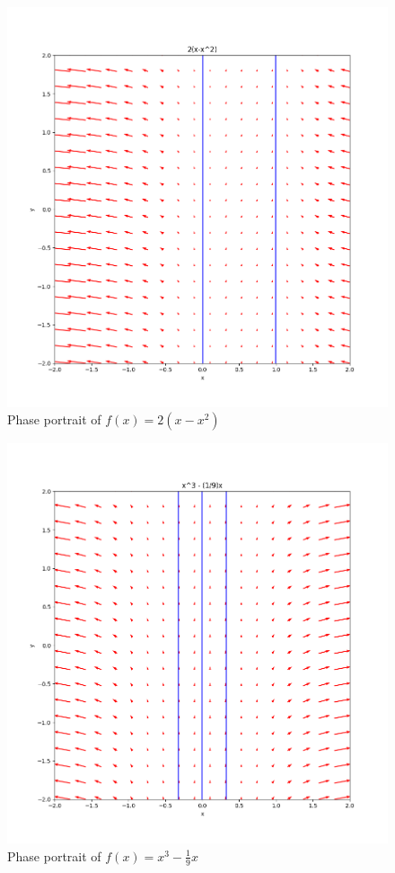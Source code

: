 \documentclass[11pt]{article}
\begin{document}
\begin{figure}[h!]
    \centering
    \includegraphics{phase2.png}
    \caption{Phase portrait of $f(x) = 2(x − x^2)$}
    \label{fig:phase2}
\end{figure}

\begin{figure}[h!]
    \centering
    \includegraphics{phase3.png}
    \caption{Phase portrait of $f(x) = x^3 − \frac{1}{9}x$}
    \label{fig:phase3}
\end{figure}
\end{document}
